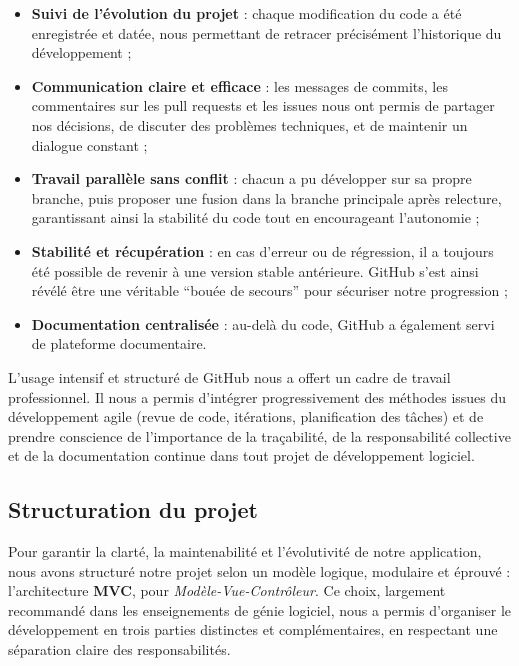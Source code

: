 \begin{itemize}
    \item \textbf{Suivi de l’évolution du projet} : chaque modification du code a été enregistrée et datée, nous permettant de retracer précisément l’historique du développement ;
    
    \item \textbf{Communication claire et efficace} : les messages de commits, les commentaires sur les pull requests et les issues nous ont permis de partager nos décisions, de discuter des problèmes techniques, et de maintenir un dialogue constant ;

    \item \textbf{Travail parallèle sans conflit} : chacun a pu développer sur sa propre branche, puis proposer une fusion dans la branche principale après relecture, garantissant ainsi la stabilité du code tout en encourageant l’autonomie ;

    \item \textbf{Stabilité et récupération} : en cas d’erreur ou de régression, il a toujours été possible de revenir à une version stable antérieure. GitHub s’est ainsi révélé être une véritable “bouée de secours” pour sécuriser notre progression ;

    \item \textbf{Documentation centralisée} : au-delà du code, GitHub a également servi de plateforme documentaire. 
\end{itemize}

L’usage intensif et structuré de GitHub nous a offert un cadre de travail professionnel. Il nous a permis d’intégrer progressivement des méthodes issues du développement agile (revue de code, itérations, planification des tâches) et de prendre conscience de l’importance de la traçabilité, de la responsabilité collective et de la documentation continue dans tout projet de développement logiciel.

\subsection{Structuration du projet}

Pour garantir la clarté, la maintenabilité et l’évolutivité de notre application, nous avons structuré notre projet selon un modèle logique, modulaire et éprouvé : l’architecture \textbf{MVC}, pour \textit{Modèle-Vue-Contrôleur}. Ce choix, largement recommandé dans les enseignements de génie logiciel, nous a permis d’organiser le développement en trois parties distinctes et complémentaires, en respectant une séparation claire des responsabilités.


